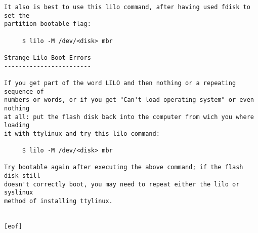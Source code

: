 \documentclass[10pt]{article}
\begin{document}
\begin{lstlisting}
It also is best to use this lilo command, after having used fdisk to set the
partition bootable flag:

     $ lilo -M /dev/<disk> mbr

Strange Lilo Boot Errors
------------------------

If you get part of the word LILO and then nothing or a repeating sequence of
numbers or words, or if you get "Can't load operating system" or even nothing
at all: put the flash disk back into the computer from wich you where loading
it with ttylinux and try this lilo command:

     $ lilo -M /dev/<disk> mbr

Try bootable again after executing the above command; if the flash disk still
doesn't correctly boot, you may need to repeat either the lilo or syslinux
method of installing ttylinux.


[eof]
\end{lstlisting}
\end{document}
